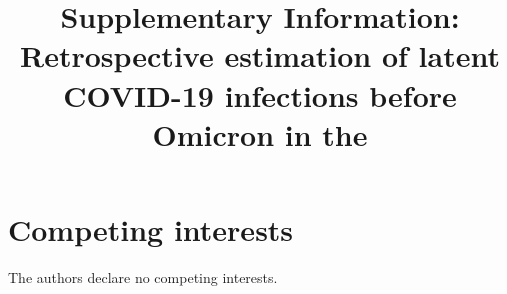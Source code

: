 \documentclass{article}
\newcommand{\beginsupplement}{
  \setcounter{table}{0}  
  \renewcommand{\thetable}{S\arabic{table}} 
  \renewcommand{\theHtable}{S\arabic{table}} 
  \setcounter{figure}{0} 
  \renewcommand{\thefigure}{S\arabic{figure}}
    \renewcommand{\theHfigure}{S\arabic{figure}} 
  \setcounter{section}{0} 
  \renewcommand{\thesection}{S\arabic{section}}
}
\begin{document}
\section*{Competing interests}

The authors declare no competing interests.

\clearpage
\beginsupplement
\title{\supptitlefont\noindent Supplementary Information: Retrospective estimation of latent COVID-19 infections before Omicron in the \US}
\maketitle


\end{document}
